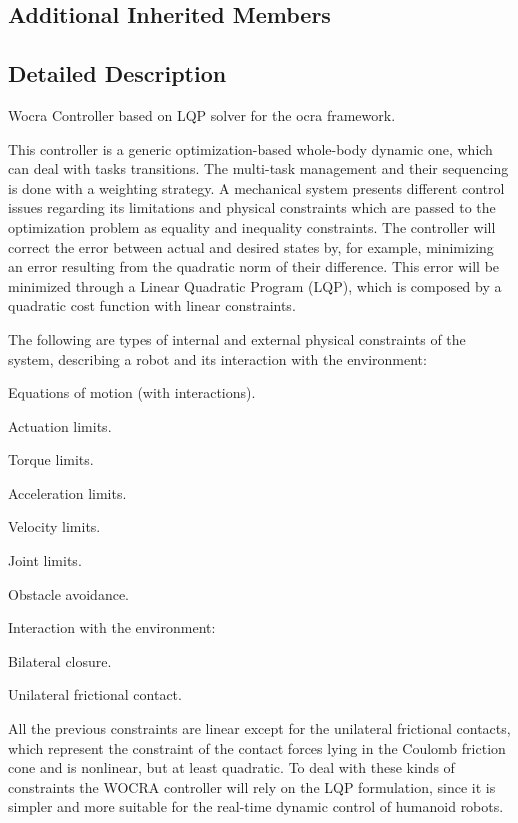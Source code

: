 \subsection*{Additional Inherited Members}


\subsection{Detailed Description}
Wocra Controller based on L\+QP solver for the ocra framework. 

This controller is a generic optimization-\/based whole-\/body dynamic one, which can deal with tasks transitions. The multi-\/task management and their sequencing is done with a weighting strategy. A mechanical system presents different control issues regarding its limitations and physical constraints which are passed to the optimization problem as equality and inequality constraints. The controller will correct the error between actual and desired states by, for example, minimizing an error resulting from the quadratic norm of their difference. This error will be minimized through a Linear Quadratic Program (L\+QP), which is composed by a quadratic cost function with linear constraints.

The following are types of internal and external physical constraints of the system, describing a robot and its interaction with the environment\+:


\begin{DoxyItemize}
\item Equations of motion (with interactions).
\item Actuation limits.
\begin{DoxyItemize}
\item Torque limits.
\item Acceleration limits.
\item Velocity limits.
\item Joint limits.
\end{DoxyItemize}
\item Obstacle avoidance.
\item Interaction with the environment\+:
\begin{DoxyItemize}
\item Bilateral closure.
\item Unilateral frictional contact.
\end{DoxyItemize}
\end{DoxyItemize}

All the previous constraints are linear except for the unilateral frictional contacts, which represent the constraint of the contact forces lying in the Coulomb friction cone and is nonlinear, but at least quadratic. To deal with these kinds of constraints the W\+O\+C\+RA controller will rely on the L\+QP formulation, since it is simpler and more suitable for the real-\/time dynamic control of humanoid robots.

